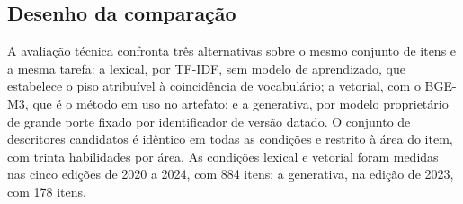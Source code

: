 \subsection{Desenho da comparação}

A avaliação técnica confronta três alternativas sobre o mesmo conjunto de itens
e a mesma tarefa: a lexical, por TF-IDF, sem modelo de aprendizado, que
estabelece o piso atribuível à coincidência de vocabulário; a vetorial, com o
BGE-M3, que é o método em uso no artefato; e a generativa, por modelo
proprietário de grande porte fixado por identificador de versão datado. O
conjunto de descritores candidatos é idêntico em todas as condições e restrito
à área do item, com trinta habilidades por área. As condições lexical e
vetorial foram medidas nas cinco edições de 2020 a 2024, com 884 itens; a
generativa, na edição de 2023, com 178 itens.
